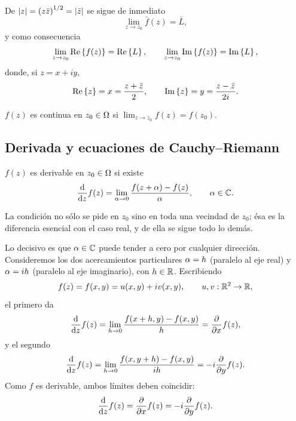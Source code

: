 De $\lvert z \rvert=\left( z\bar{z} \right)^{1/2}=\lvert \bar{z} \rvert$ se sigue de inmediato
\begin{equation}
  \label{eq:limite_conjugado}
  \lim_{z\rightarrow z_0}\bar{f}(z)=\bar{L},
\end{equation}
y como consecuencia
\begin{equation}
  \label{eq:limite_partes}
  \lim_{z\rightarrow z_0}\operatorname{Re}\left\{ f(z) \right\}=\operatorname{Re}\left\{ L \right\},
  \qquad
  \lim_{z\rightarrow z_0}\operatorname{Im}\left\{ f(z) \right\}=\operatorname{Im}\left\{ L \right\},
\end{equation}
donde, si $z=x+iy$,
\begin{equation}
  \label{eq:partes_real_imaginaria}
  \operatorname{Re}\left\{ z \right\}=x=\frac{z+\bar{z}}{2},
  \qquad
  \operatorname{Im}\left\{ z \right\}=y=\frac{z-\bar{z}}{2i} .
\end{equation}

\begin{definicion}[Continuidad]
  \label{def:continuidad_compleja}
  $f(z)$ es continua en $z_0\in\Omega$ si
  $\lim_{z\rightarrow z_0}f(z)=f(z_0)$.
\end{definicion}

\subsection{Derivada y ecuaciones de Cauchy--Riemann}
\label{subsec:cauchy_riemann}

\begin{definicion}
  \label{def:derivada_compleja}
  $f(z)$ es derivable en $z_0\in\Omega$ si existe
  \begin{equation}
    \label{eq:derivada_compleja}
    \frac{\mathrm{d}}{\mathrm{d}z}f(z)=\lim_{\alpha\rightarrow 0}
      \frac{f(z+\alpha)-f(z)}{\alpha},
    \qquad \alpha\in\mathbb{C} .
  \end{equation}
\end{definicion}

\begin{observacion}
  La condici\'on no s\'olo se pide en $z_0$ sino en toda una vecindad de
  $z_0$; \'esa es la diferencia esencial con el caso real, y de ella se sigue
  todo lo dem\'as.
\end{observacion}

Lo decisivo es que $\alpha\in\mathbb{C}$ puede tender a cero por cualquier direcci\'on.
Consideremos los dos acercamientos particulares
$\alpha=h$ (paralelo al eje real) y $\alpha=ih$ (paralelo al eje imaginario), con
$h\in\mathbb{R}$. Escribiendo
\begin{equation}
  \label{eq:f_u_v}
  f(z)=f(x,y)=u(x,y)+iv(x,y),
  \qquad u,v:\mathbb{R}^2\rightarrow\mathbb{R},
\end{equation}
el primero da
\begin{equation}
  \label{eq:derivada_x}
  \frac{\mathrm{d}}{\mathrm{d}z}f(z)=\lim_{h\rightarrow 0}\frac{f(x+h,y)-f(x,y)}{h}
    =\frac{\partial }{\partial x}f(z),
\end{equation}
y el segundo
\begin{equation}
  \label{eq:derivada_y}
  \frac{\mathrm{d}}{\mathrm{d}z}f(z)=\lim_{h\rightarrow 0}\frac{f(x,y+h)-f(x,y)}{ih}
    =-i\frac{\partial }{\partial y}f(z).
\end{equation}
Como $f$ es derivable, ambos l\'imites deben coincidir:
\begin{equation}
  \label{eq:condicion_derivada}
  \frac{\mathrm{d}}{\mathrm{d}z}f(z)=\frac{\partial }{\partial x}f(z)=-i\frac{\partial }{\partial y}f(z).
\end{equation}

